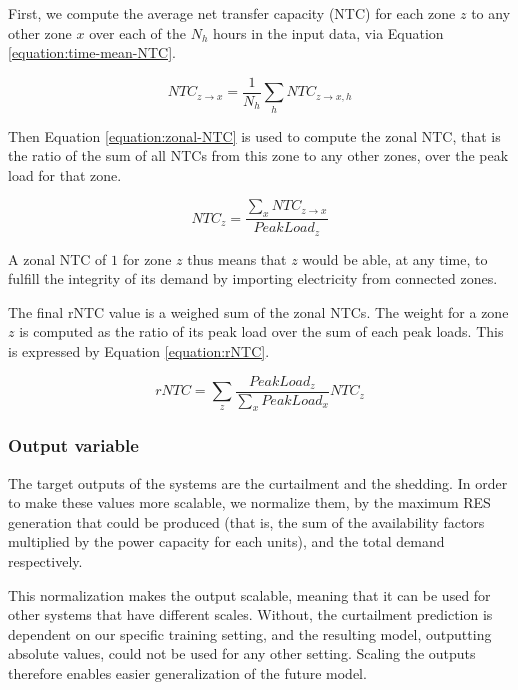 \begin{enumerate}
    First, we compute the average net transfer capacity (NTC) for each zone $z$ to any other zone $x$ over each of the $N_h$ hours in the input data, via Equation \ref{equation:time-mean-NTC}.

    \begin{equation}
        NTC_{z\rightarrow x} = \frac{1}{N_h} \sum_h NTC_{z\rightarrow x,h}
        \label{equation:time-mean-NTC}
    \end{equation}

    Then Equation \ref{equation:zonal-NTC} is used to compute the zonal NTC, that is the ratio of the sum of all NTCs from this zone to any other zones, over the peak load for that zone.

    \begin{equation}
        NTC_z = \frac{\sum_x NTC_{z\rightarrow x}}{PeakLoad_z}
        \label{equation:zonal-NTC}
    \end{equation}

    A zonal NTC of $1$ for zone $z$ thus means that $z$ would be able, at any time, to fulfill the integrity of its demand by importing electricity from connected zones.

    The final rNTC value is a weighed sum of the zonal NTCs. The weight for a zone $z$ is computed as the ratio of its peak load over the sum of each peak loads. This is expressed by Equation \ref{equation:rNTC}.

    \begin{equation}
        rNTC = \sum_z \frac{PeakLoad_z}{\sum_x PeakLoad_x} NTC_z
        \label{equation:rNTC}
    \end{equation}
\end{enumerate}

\subsubsection{Output variable}

The target outputs of the systems are the curtailment and the shedding. In order to make these values more scalable, we normalize them, by the maximum RES generation that could be produced (that is, the sum of the availability factors multiplied by the power capacity for each units), and the total demand respectively.

This normalization makes the output scalable, meaning that it can be used for other systems that have different scales. Without, the curtailment prediction is dependent on our specific training setting, and the resulting model, outputting absolute values, could not be used for any other setting. Scaling the outputs therefore enables easier generalization of the future model.

